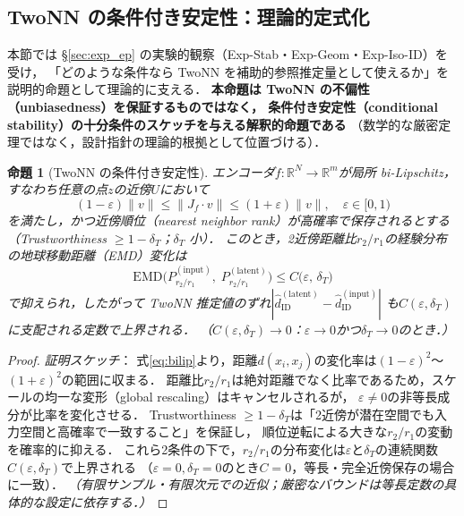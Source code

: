 \documentclass[11pt,a4paper]{jsarticle}
\newtheorem{proposition}{命題}
\newcommand{\R}{\mathbb{R}}
\begin{document}
\subsection{TwoNN の条件付き安定性：理論的定式化}\label{sec:theory_stability}

本節では §\ref{sec:exp_ep} の実験的観察（Exp-Stab・Exp-Geom・Exp-Iso-ID）を受け，
「どのような条件なら TwoNN を補助的参照推定量として使えるか」を
説明的命題として理論的に支える．
\textbf{本命題は TwoNN の不偏性（unbiasedness）を保証するものではなく，
条件付き安定性（conditional stability）の十分条件のスケッチを与える解釈的命題である}
（数学的な厳密定理ではなく，設計指針の理論的根拠として位置づける）．

\begin{proposition}[TwoNN の条件付き安定性]\label{thm:twonn_stability}
エンコーダ$f: \R^N \to \R^m$が局所 bi-Lipschitz，
すなわち任意の点$z$の近傍$U$において
\begin{equation}
  (1-\varepsilon)\|v\| \leq \|J_f \cdot v\| \leq (1+\varepsilon)\|v\|,
  \quad \varepsilon \in [0,1)
  \label{eq:bilip}
\end{equation}
を満たし，かつ近傍順位（nearest neighbor rank）が高確率で保存されるとする
（Trustworthiness $\geq 1 - \delta_T$；$\delta_T$ 小）．
このとき，2近傍距離比$r_2/r_1$の経験分布の地球移動距離（EMD）変化は
\begin{equation}
  \mathrm{EMD}\bigl(P_{r_2/r_1}^{(\mathrm{input})},\; P_{r_2/r_1}^{(\mathrm{latent})}\bigr)
  \leq C\bigl(\varepsilon,\, \delta_T\bigr)
  \label{eq:twonn_stab}
\end{equation}
で抑えられ，したがって TwoNN 推定値のずれ$|\hat{d}_\mathrm{ID}^{(\mathrm{latent})} - \hat{d}_\mathrm{ID}^{(\mathrm{input})}|$
も$C(\varepsilon,\delta_T)$に支配される定数で上界される．
（$C(\varepsilon, \delta_T) \to 0$：$\varepsilon \to 0$かつ$\delta_T \to 0$のとき．）
\end{proposition}

\begin{proof}
\textit{証明スケッチ}：
式\eqref{eq:bilip}より，距離$d(x_i, x_j)$の変化率は$(1-\varepsilon)^2$〜$(1+\varepsilon)^2$の範囲に収まる．
距離比$r_2/r_1$は絶対距離でなく比率であるため，スケールの均一な変形（global rescaling）はキャンセルされるが，
$\varepsilon \neq 0$の非等長成分が比率を変化させる．
Trustworthiness $\geq 1-\delta_T$は「2近傍が潜在空間でも入力空間と高確率で一致すること」を保証し，
順位逆転による大きな$r_2/r_1$の変動を確率的に抑える．
これら2条件の下で，$r_2/r_1$の分布変化は$\varepsilon$と$\delta_T$の連続関数$C(\varepsilon,\delta_T)$で上界される
（$\varepsilon=0, \delta_T=0$のとき$C=0$，等長・完全近傍保存の場合に一致）．
\textit{（有限サンプル・有限次元での近似；厳密なバウンドは等長定数の具体的な設定に依存する．）}
\end{proof}
\end{document}

